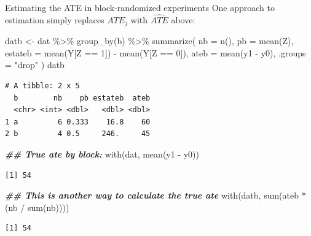 \documentclass[
  ignorenonframetext,
]{beamer}
\newenvironment{Shaded}{\begin{snugshade}}{\end{snugshade}}
\newcommand{\AttributeTok}[1]{\textcolor[rgb]{0.77,0.63,0.00}{#1}}
\newcommand{\DecValTok}[1]{\textcolor[rgb]{0.00,0.00,0.81}{#1}}
\newcommand{\DocumentationTok}[1]{\textcolor[rgb]{0.56,0.35,0.01}{\textbf{\textit{#1}}}}
\newcommand{\FunctionTok}[1]{\textcolor[rgb]{0.00,0.00,0.00}{#1}}
\newcommand{\NormalTok}[1]{#1}
\newcommand{\OtherTok}[1]{\textcolor[rgb]{0.56,0.35,0.01}{#1}}
\newcommand{\SpecialCharTok}[1]{\textcolor[rgb]{0.00,0.00,0.00}{#1}}
\newcommand{\StringTok}[1]{\textcolor[rgb]{0.31,0.60,0.02}{#1}}
\begin{document}
\begin{frame}[fragile]{Estimating the ATE in block-randomized
experiments}
\protect\hypertarget{estimating-the-ate-in-block-randomized-experiments-1}{}
One approach to estimation simply replaces \(ATE_j\) with
\(\widehat{ATE}\) above:

\scriptsize

\begin{Shaded}
\begin{Highlighting}[]
\NormalTok{datb }\OtherTok{\textless{}{-}}\NormalTok{ dat }\SpecialCharTok{\%\textgreater{}\%}
  \FunctionTok{group\_by}\NormalTok{(b) }\SpecialCharTok{\%\textgreater{}\%}
  \FunctionTok{summarize}\NormalTok{(}
    \AttributeTok{nb =} \FunctionTok{n}\NormalTok{(), }\AttributeTok{pb =} \FunctionTok{mean}\NormalTok{(Z), }\AttributeTok{estateb =} \FunctionTok{mean}\NormalTok{(Y[Z }\SpecialCharTok{==} \DecValTok{1}\NormalTok{]) }\SpecialCharTok{{-}} \FunctionTok{mean}\NormalTok{(Y[Z }\SpecialCharTok{==} \DecValTok{0}\NormalTok{]),}
    \AttributeTok{ateb =} \FunctionTok{mean}\NormalTok{(y1 }\SpecialCharTok{{-}}\NormalTok{ y0), }\AttributeTok{.groups =} \StringTok{"drop"}
\NormalTok{  )}
\NormalTok{datb}
\end{Highlighting}
\end{Shaded}

\begin{verbatim}
# A tibble: 2 x 5
  b        nb    pb estateb  ateb
  <chr> <int> <dbl>   <dbl> <dbl>
1 a         6 0.333    16.8    60
2 b         4 0.5     246.     45
\end{verbatim}

\begin{Shaded}
\begin{Highlighting}[]
\DocumentationTok{\#\# True ate by block:}
\FunctionTok{with}\NormalTok{(dat, }\FunctionTok{mean}\NormalTok{(y1 }\SpecialCharTok{{-}}\NormalTok{ y0))}
\end{Highlighting}
\end{Shaded}

\begin{verbatim}
[1] 54
\end{verbatim}

\begin{Shaded}
\begin{Highlighting}[]
\DocumentationTok{\#\# This is another way to calculate the true ate}
\FunctionTok{with}\NormalTok{(datb, }\FunctionTok{sum}\NormalTok{(ateb }\SpecialCharTok{*}\NormalTok{ (nb }\SpecialCharTok{/} \FunctionTok{sum}\NormalTok{(nb))))}
\end{Highlighting}
\end{Shaded}

\begin{verbatim}
[1] 54
\end{verbatim}

\normalsize
\end{frame}
\end{document}
